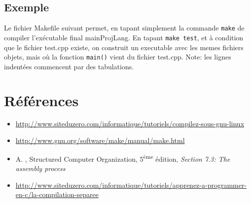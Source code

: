 \documentclass[a4paper]{article}
\begin{document}
\subsection{Exemple} 
Le fichier Makefile suivant permet, en tapant simplement la commande \lstinline{make} de compiler l'exécutable final mainProjLang. En tapant \lstinline{make test}, et à condition que le fichier test.cpp existe, on construit un executable avec les memes fichiers objets, mais où la fonction \lstinline{main()} vient du fichier test.cpp. Note: les lignes indentées commencent par des tabulations.



\section{Références}
\begin{itemize}
	\item \url{http://www.siteduzero.com/informatique/tutoriels/compilez-sous-gnu-linux}
	\item \url{http://www.gnu.org/software/make/manual/make.html}
	\item A. , Structured Computer Organization, 5\textsuperscript{ème} édition, \textit{Section 7.3: The assembly process}
	\item \url{http://www.siteduzero.com/informatique/tutoriels/apprenez-a-programmer-en-c/la-compilation-separee}
\end{itemize}
\end{document}

